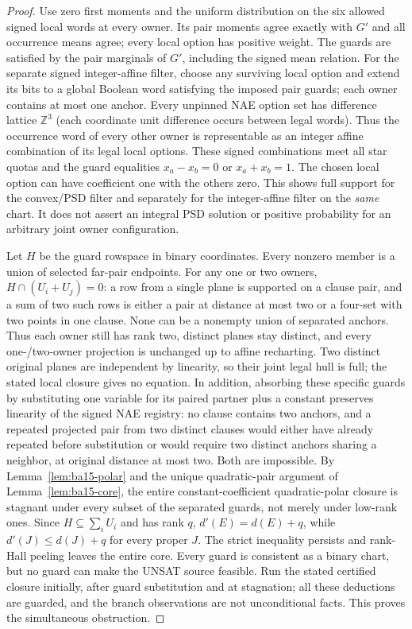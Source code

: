 \documentclass[11pt]{article}
\begin{document}
\begin{proof}
Use zero first moments and the uniform distribution on the six allowed signed local words at every owner. Its pair moments agree exactly with $G'$ and all occurrence means agree; every local option has positive weight. The guards are satisfied by the pair marginals of $G'$, including the signed mean relation. For the separate signed integer-affine filter, choose any surviving local option and extend its bits to a global Boolean word satisfying the imposed pair guards; each owner contains at most one anchor. Every unpinned NAE option set has difference lattice $\mathbb Z^3$ (each coordinate unit difference occurs between legal words). Thus the occurrence word of every other owner is representable as an integer affine combination of its legal local options. These signed combinations meet all star quotas and the guard equalities $x_a-x_b=0$ or $x_a+x_b=1$. The chosen local option can have coefficient one with the others zero. This shows full support for the convex/PSD filter and separately for the integer-affine filter on the \emph{same} chart. It does not assert an integral PSD solution or positive probability for an arbitrary joint owner configuration.

Let $H$ be the guard rowspace in binary coordinates. Every nonzero member is a union of selected far-pair endpoints. For any one or two owners, $H\cap(U_i+U_j)=0$: a row from a single plane is supported on a clause pair, and a sum of two such rows is either a pair at distance at most two or a four-set with two points in one clause. None can be a nonempty union of separated anchors. Thus each owner still has rank two, distinct planes stay distinct, and every one-/two-owner projection is unchanged up to affine recharting. Two distinct original planes are independent by linearity, so their joint legal hull is full; the stated local closure gives no equation. In addition, absorbing these specific guards by substituting one variable for its paired partner plus a constant preserves linearity of the signed NAE registry: no clause contains two anchors, and a repeated projected pair from two distinct clauses would either have already repeated before substitution or would require two distinct anchors sharing a neighbor, at original distance at most two. Both are impossible. By Lemma~\ref{lem:ba15-polar} and the unique quadratic-pair argument of Lemma~\ref{lem:ba15-core}, the entire constant-coefficient quadratic-polar closure is stagnant under every subset of the separated guards, not merely under low-rank ones. Since $H\subseteq\sum_i U_i$ and has rank $q$, $d'(E)=d(E)+q$, while $d'(J)\le d(J)+q$ for every proper $J$. The strict inequality persists and rank-Hall peeling leaves the entire core. Every guard is consistent as a binary chart, but no guard can make the UNSAT source feasible. Run the stated certified closure initially, after guard substitution and at stagnation; all these deductions are guarded, and the branch observations are not unconditional facts. This proves the simultaneous obstruction.
\end{proof}
\end{document}
